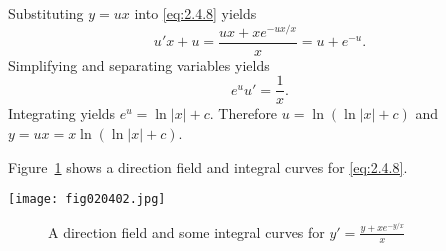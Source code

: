\documentclass{ximera}
\begin{document}
Substituting  $y=ux$
into \eqref{eq:2.4.8} yields
$$
u'x+u =  \frac{ux+xe^{-ux/x}}{x} = u+e^{-u}.
$$
 Simplifying and separating variables yields
$$
e^uu'=\frac{1}{x}.
$$
Integrating yields
$e^u=\ln |x|+c$.
Therefore
$u=\ln(\ln|x|+c)$ and
$y=ux=x \ln (\ln |x|+c)$.

Figure~\ref{figure:2.4.2} shows
a direction field and integral curves for \eqref{eq:2.4.8}.


\begin{image}
\texttt{[image: fig020402.jpg]}
\end{image}
\begin{center}
\begin{figure}
\caption
{A direction field and some integral curves for
$y'=\frac{y+xe^{-y/x}}{x}$}
  \label{figure:2.4.2}
\end{figure}
\end{center}
\end{document}
